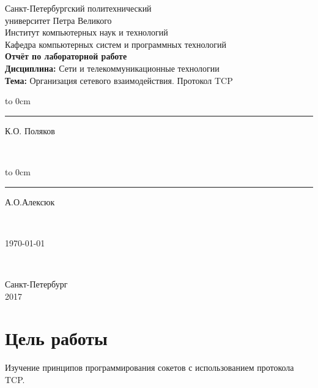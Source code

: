 \documentclass[a4paper,14pt]{article}
\begin{document}

\begin{titlepage}
	\newpage
	\begin{center} %
		Санкт-Петербургский политехнический\\ 
		университет Петра Великого\\
		Институт компьютерных наук и технологий\\
		Кафедра компьютерных систем и программных технологий\\
		\vspace{7cm}
		\textbf {Отчёт по лабораторной работе}\\
		\textbf {Дисциплина:} Сети и телекоммуникационные технологии\\
		\textbf{Тема:} Организация сетевого взаимодействия. Протокол TCP
	\end{center} %
	\vspace{8cm} %
	
	\vfill
	
	\hfill\parbox{9 cm}{\hspace*{3cm}\hbox to 0cm{\raisebox{-1em}{\small(подпись)}}\hspace*{-0.8cm}\rule{3cm}{0.8pt} К.О. Поляков}\\[0.6cm]
	
	 \hfill\parbox{9 cm}{\hspace*{3cm}\hbox to 0cm{\raisebox{-1em}{\small(подпись)}}\hspace*{-0.8cm}\rule{3cm}{0.8pt} А.О.Алексюк }\\[0.6cm]
	
	\hfill\parbox{9 cm}{\hspace*{5cm} \today }\\[0.6cm]

	\vspace{\fill}
	\begin{center}
		Санкт-Петербург \\ 2017	
	\end{center}
\end{titlepage}

\tableofcontents

\newpage

\setcounter {section}{0}
\setcounter {equation}{0}
\setcounter {figure}{0}
\section{Цель работы}
\hspace{0,5cm}   Изучение принципов программирования сокетов с использованием протокола TCP.
\end{document}
